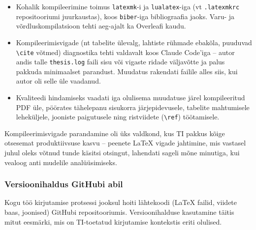 \begin{itemize}
    \item Kohalik kompileerimine toimus \texttt{latexmk}-i ja \texttt{lualatex}-iga (vt \texttt{.latexmkrc} repositooriumi juurkaustas), koos \texttt{biber}-iga bibliograafia jaoks. Varu- ja võrdluskompilatsioon tehti aeg-ajalt ka Overleafi kaudu.
    \item Kompileerimisvigade (nt tabelite ülevalg, lahtiste rühmade ebakõla, puuduvad \texttt{\textbackslash cite} võtmed) diagnostika tehti valdavalt koos Claude Code'iga -- autor andis talle \texttt{thesis.log} faili sisu või vigaste ridade väljavõtte ja palus pakkuda minimaalset parandust. Muudatus rakendati failile alles siis, kui autor oli selle üle vaadanud.
    \item Kvaliteedi hindamiseks vaadati iga olulisema muudatuse järel kompileeritud PDF üle, pöörates tähelepanu sisukorra järjepidevusele, tabelite mahtumisele leheküljele, jooniste paigutusele ning ristviidete (\texttt{\textbackslash ref}) töötamisele.
\end{itemize}

Kompileerimisvigade parandamine oli üks valdkond, kus TI pakkus kõige otsesemat produktiivsuse kasvu -- peenete \LaTeX{} vigade jahtimine, mis vastasel juhul oleks võtnud tunde käsitsi otsingut, lahendati sageli mõne minutiga, kui vealoog anti mudelile analüüsimiseks.

\subsubsection{Versioonihaldus GitHubi abil}

Kogu töö kirjutamise protsessi jooksul hoiti lähtekoodi (\LaTeX{} failid, viidete baas, joonised) GitHubi repositooriumis. Versioonihalduse kasutamine täitis mitut eesmärki, mis on TI-toetatud kirjutamise kontekstis eriti olulised.

